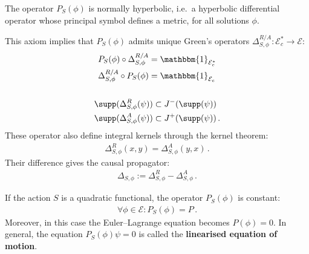     \begin{axiom}
        The operator $P_S(\phi)$ is normally hyperbolic, i.e.~a hyperbolic differential operator whose principal symbol defines a metric, for all solutions $\phi$.
    \end{axiom}

    This axiom implies that $P_S(\phi)$ admits unique Green's operators $\Delta^{R/A}_{S,\phi}:\mathcal{E}^*_c\rightarrow\mathcal{E}$:
    \begin{gather}
        \begin{aligned}
            P_S(\phi)\circ\Delta^{R/A}_{S,\phi} &= \mathbbm{1}_{\mathcal{E}^*_c}\\
            \Delta^{R/A}_{S,\phi}\circ P_S(\phi) &= \mathbbm{1}_{\mathcal{E}_c}
        \end{aligned}\\\nonumber\\
        \begin{aligned}
            \supp(\Delta^R_{S,\phi}(\psi)) &\subset J^-(\supp(\psi))\\
            \supp(\Delta^A_{S,\phi}(\psi)) &\subset J^+(\supp(\psi))\,.
        \end{aligned}
    \end{gather}
    These operator also define integral kernels through the kernel theorem:
    \begin{gather}
        \Delta^R_{S,\phi}(x,y) = \Delta^A_{S,\phi}(y,x)\,.
    \end{gather}
    Their difference gives the causal propagator:
    \begin{gather}
        \Delta_{S,\phi} := \Delta^R_{S,\phi} - \Delta^A_{S,\phi}\,.
    \end{gather}

    \begin{property}
        If the action $S$ is a quadratic functional, the operator $P_S(\phi)$ is constant:
        \begin{gather}
            \forall\phi\in\mathcal{E}:P_S(\phi)=P\,.
        \end{gather}
        Moreover, in this case the Euler--Lagrange equation becomes $P(\phi) = 0$. In general, the equation $P_S(\phi)\psi=0$ is called the \textbf{linearised equation of motion}.
    \end{property}

